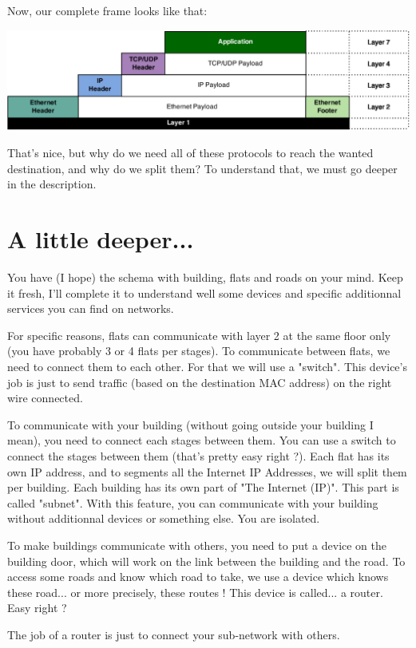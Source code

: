 \documentclass{article}
\begin{document}
	Now, our complete frame looks like that:
	\begin{center}
	\includegraphics[scale=0.3]{content/layer7.eps}
	\end{center}
	
	That's nice, but why do we need all of these protocols to reach the wanted destination, and why do we split them?
	To understand that, we must go deeper in the description.

\section{A little deeper...}
	You have (I hope) the schema with building, flats and roads on your mind. Keep it fresh, I'll complete it to 
	understand well some devices and specific additionnal services you can find on networks.
	
	For specific reasons, flats can communicate with layer 2 at the same floor only (you have probably 3 or 4 flats
	per stages). To communicate between flats, we need to connect them to each other. For that we will use a "switch".
	This device's job is just to send traffic (based on the destination MAC address) on the right wire connected.
	
	To communicate with your building (without going outside your building I mean), you need to connect each stages between
	them. You can use a switch to connect the stages between them (that's pretty easy right ?). Each flat has its own
	IP address, and to segments all the Internet IP Addresses, we will split them per building. Each building has its own
	part of "The Internet (IP)". This part is called "subnet". With this feature, you can communicate with your building
	without additionnal devices or something else. You are isolated.
	
	To make buildings communicate with others, you need to put a device on the building door, which will work on the
	link between the building and the road. To access some roads and know which road to take, we use a device
	which knows these road... or more precisely, these routes ! This device is called... a router. Easy right ?
	
	The job of a router is just to connect your sub-network with others.
	
\end{document}
